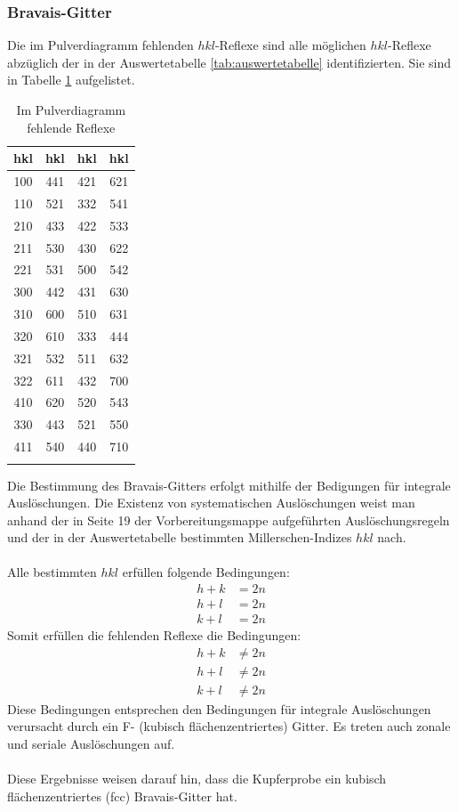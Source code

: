 \documentclass[a4paper,titlepage]{scrartcl}
\numberwithin{equation}{section}
\begin{document}
\subsubsection{Bravais-Gitter}
Die im Pulverdiagramm fehlenden $hkl$-Reflexe sind alle möglichen $hkl$-Reflexe abzüglich der in der Auswertetabelle \ref{tab:auswertetabelle} identifizierten. Sie sind in Tabelle \ref{tab:fehlendereflexe} aufgelistet.
\begin{longtable}[H]{c||c||c||c}
hkl&hkl&hkl&hkl\\
\hline
100 & 441 & 421 & 621\\
110 & 521 & 332 & 541\\
210 & 433 & 422 & 533\\
211 & 530 & 430 & 622\\
221 & 531 & 500 & 542\\
300 & 442 & 431 & 630\\
310 & 600 & 510 & 631\\
320 & 610 & 333 & 444\\
321 & 532 & 511 & 632\\
322 & 611 & 432 & 700\\
410 & 620 & 520 & 543\\
330 & 443 & 521 & 550\\
411 & 540 & 440 & 710\\
\caption{Im Pulverdiagramm fehlende Reflexe}
\label{tab:fehlendereflexe}
\end{longtable}
Die Bestimmung des Bravais-Gitters erfolgt mithilfe der Bedigungen für integrale Auslöschungen. Die Existenz von systematischen Auslöschungen weist man anhand der in Seite 19 der Vorbereitungsmappe aufgeführten Auslöschungsregeln und der in der Auswertetabelle bestimmten Millerschen-Indizes $hkl$ nach.\\ \\
Alle bestimmten $hkl$ erfüllen folgende Bedingungen:
\begin{align*}
h+k& = 2n\\
h+l& = 2n\\
k+l& = 2n
\end{align*}
Somit erfüllen die fehlenden Reflexe die Bedingungen:
\begin{align*}
h+k& \neq 2n\\
h+l& \neq 2n\\
k+l& \neq 2n
\end{align*}
Diese Bedingungen entsprechen den Bedingungen für integrale Auslöschungen verursacht durch ein F- (kubisch flächenzentriertes) Gitter. Es treten auch zonale und seriale Auslöschungen auf.\\ \\
Diese Ergebnisse weisen darauf hin, dass die Kupferprobe ein kubisch flächenzentriertes (fcc) Bravais-Gitter hat.
\end{document}
